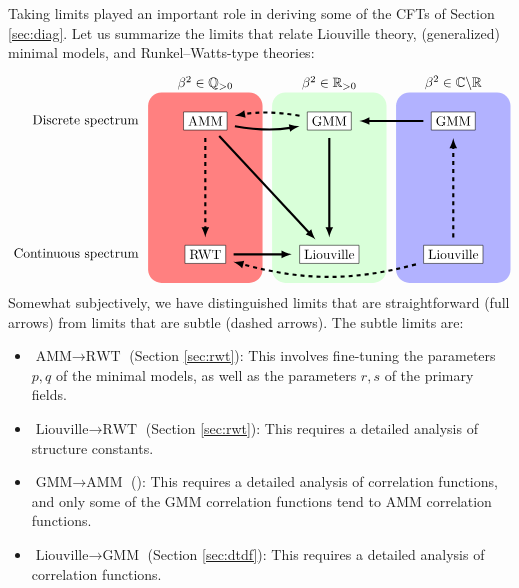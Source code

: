 \documentclass[12pt, a4paper]{article}
\begin{document}
Taking limits played an important role in deriving some of the CFTs of Section \ref{sec:diag}. 
Let us summarize the limits that relate Liouville theory, (generalized) minimal models, and Runkel--Watts-type theories: 
\begin{align}
\begin{tikzpicture}[scale = .25, baseline=(current  bounding  box.center)]
\fill[red!50, rounded corners = 10] (-6, -10) rectangle (6, 10);
\fill[green!15, rounded corners = 10] (7, -10) rectangle (19, 10);
\fill[blue!30, rounded corners = 10] (20, -10) rectangle (32, 10);
\node at (0, 11) {$\beta^2\in\mathbb{Q}_{>0}$};
\node at (13, 11) {$\beta^2\in\mathbb{R}_{>0}$};
\node at (26, 11) {$\beta^2\in \mathbb{C}\backslash \mathbb{R}$};
\node[left] at (-6.5, 7) {Discrete spectrum};
\node[left] at (-6.5, -7) {Continuous spectrum};
\draw (0, 7) node[draw, fill = white] (mm) {AMM};
\draw (13, 7) node[draw, fill = white] (gmm1) {GMM};
\draw (26, 7) node[draw, fill = white] (gmm2) {GMM};
\draw (0, -7) node[draw, fill = white] (rwt) {RWT};
\draw (13, -7) node[draw, fill = white] (clo) {Liouville};
\draw (26, -7) node[draw, fill = white] (liou) {Liouville};
\draw [ultra thick, shorten <= 2mm, shorten >= 2mm, -latex, 
       out = -10, in = -170] (mm) to (gmm1);
\draw [ultra thick, shorten <= 2mm, shorten >= 2mm, -latex, dashed,
       out = 170, in = 10] (gmm1) to (mm);
\draw [ultra thick, shorten <= 2mm, shorten >= 2mm, -latex] (gmm2) to (gmm1);
\draw [ultra thick, shorten <= 2mm, shorten >= 2mm, -latex] (mm) to (clo);
\draw [ultra thick, shorten <= 2mm, shorten >= 2mm, -latex, dashed] (mm) to (rwt);
\draw [ultra thick, shorten <= 2mm, shorten >= 2mm, -latex] (rwt) to (clo);
\draw [ultra thick, shorten <= 2mm, shorten >= 2mm, -latex] (gmm1) to (clo);
\draw [ultra thick, shorten <= 2mm, shorten >= 2mm, -latex,
       out = -165, in = -15, dashed] (liou) to (rwt);
\draw [ultra thick, shorten <= 2mm, shorten >= 2mm, -latex, dashed] (liou) to (gmm2);
\end{tikzpicture}
\label{lims}
\end{align}
Somewhat subjectively, we have distinguished limits that are straightforward (full arrows) from limits that are subtle (dashed arrows). The subtle limits are:
\begin{itemize}
 \item $\boxed{\text{AMM}\to \text{RWT}}$ (Section \ref{sec:rwt}): This involves fine-tuning the parameters $p,q$ of the minimal models, as well as the parameters $r,s$ of the primary fields.
  \item $\boxed{\text{Liouville}\to \text{RWT}}$ (Section \ref{sec:rwt}): This requires a detailed analysis of structure constants. 
 \item $\boxed{\text{GMM}\to \text{AMM}}$ (\cite{rib18}): This requires a detailed analysis of correlation functions, and only some of the GMM correlation functions tend to AMM correlation functions. 
 \item $\boxed{\text{Liouville}\to \text{GMM}}$ (Section \ref{sec:dtdf}): This requires a detailed analysis of correlation functions.
\end{itemize}
\end{document}
